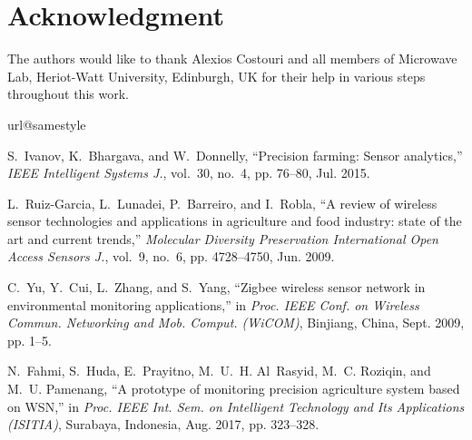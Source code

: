 \documentclass[journal]{IEEEtran}
\begin{document}
\section*{Acknowledgment}
\normalsize 
The authors would like to thank  Alexios Costouri and all members of  Microwave Lab, Heriot-Watt University, Edinburgh, UK  for their help in various steps throughout this work. 

\begin{thebibliography}{10}
\providecommand{\url}[1]{#1}
\csname url@samestyle\endcsname
\providecommand{\newblock}{\relax}
\providecommand{\bibinfo}[2]{#2}
\providecommand{\BIBentrySTDinterwordspacing}{\spaceskip=0pt\relax}
\providecommand{\BIBentryALTinterwordstretchfactor}{4}
\providecommand{\BIBentryALTinterwordspacing}{\spaceskip=\fontdimen2\font plus
\BIBentryALTinterwordstretchfactor\fontdimen3\font minus
  \fontdimen4\font\relax}
\providecommand{\BIBforeignlanguage}[2]{{%
\expandafter\ifx\csname l@#1\endcsname\relax
\typeout{** WARNING: IEEEtran.bst: No hyphenation pattern has been}%
\typeout{** loaded for the language `#1'. Using the pattern for}%
\typeout{** the default language instead.}%
\else
\language=\csname l@#1\endcsname
\fi
#2}}
\providecommand{\BIBdecl}{\relax}
\BIBdecl

S.~Ivanov, K.~Bhargava, and W.~Donnelly, ``Precision farming: Sensor
  analytics,'' \emph{{IEEE} Intelligent Systems J.}, vol.~30, no.~4, pp.
  76--80, Jul. 2015.

L.~Ruiz-Garcia, L.~Lunadei, P.~Barreiro, and I.~Robla, ``A review of wireless
  sensor technologies and applications in agriculture and food industry: state
  of the art and current trends,'' \emph{Molecular Diversity Preservation
  International Open Access Sensors J.}, vol.~9, no.~6, pp. 4728--4750, Jun.
  2009.

C.~Yu, Y.~Cui, L.~Zhang, and S.~Yang, ``Zigbee wireless sensor network in
  environmental monitoring applications,'' in \emph{Proc. {IEEE} Conf. on
  Wireless Commun. Networking and Mob. Comput. (WiCOM)}, Binjiang, {C}hina,
  Sept. 2009, pp. 1--5.

N.~Fahmi, S.~Huda, E.~Prayitno, M.~U.~H. Al~Rasyid, M.~C. Roziqin, and M.~U.
  Pamenang, ``A prototype of monitoring precision agriculture system based on
  {WSN},'' in \emph{Proc. {IEEE} Int. Sem. on Intelligent Technology and Its
  Applications (ISITIA)}, {S}urabaya, {I}ndonesia, Aug. 2017, pp. 323--328.


\end{thebibliography}
\end{document}
